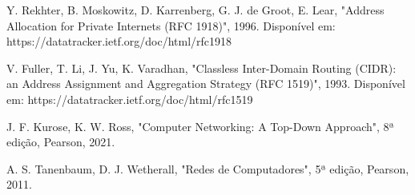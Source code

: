 \documentclass[conference,compsoc]{IEEEtran}
\begin{document}
\begin{otherlanguage}{brazil}

%
%
%
\begin{thebibliography}{9}

Y. Rekhter, B. Moskowitz, D. Karrenberg, G. J. de Groot, E. Lear, "Address Allocation for Private Internets (RFC 1918)", 1996. Disponível em: https://datatracker.ietf.org/doc/html/rfc1918

V. Fuller, T. Li, J. Yu, K. Varadhan, "Classless Inter-Domain Routing (CIDR): an Address Assignment and Aggregation Strategy (RFC 1519)", 1993. Disponível em: https://datatracker.ietf.org/doc/html/rfc1519

J. F. Kurose, K. W. Ross, "Computer Networking: A Top-Down Approach", 8ª edição, Pearson, 2021.

A. S. Tanenbaum, D. J. Wetherall, "Redes de Computadores", 5ª edição, Pearson, 2011.

\end{thebibliography}
\end{otherlanguage}
\end{document}
